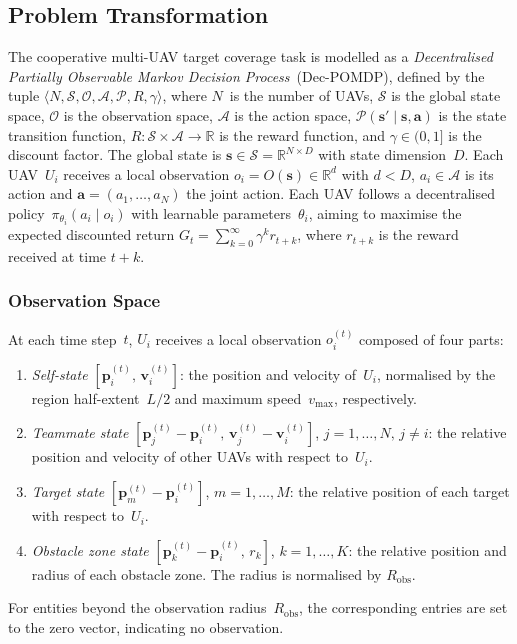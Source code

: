 \subsection{Problem Transformation}
\label{subsec:problem_transformation}

The cooperative multi-UAV target coverage task is modelled as a
\emph{Decentralised Partially Observable Markov Decision Process}~(Dec-POMDP),
defined by the tuple
$\langle N, \mathcal{S}, \mathcal{O}, \mathcal{A}, \mathcal{P}, R, \gamma
\rangle$,
where $N$~is the number of UAVs,
$\mathcal{S}$ is the global state space,
$\mathcal{O}$ is the observation space,
$\mathcal{A}$ is the action space,
$\mathcal{P}(\mathbf{s}' \mid \mathbf{s}, \mathbf{a})$ is the state transition
function,
$R: \mathcal{S} \times \mathcal{A} \to \mathbb{R}$ is the reward function, and
$\gamma \in (0,1]$ is the discount factor.
The global state is $\mathbf{s} \in \mathcal{S} = \mathbb{R}^{N \times D}$
with state dimension~$D$.
Each UAV~$U_i$ receives a local observation
$o_i = O(\mathbf{s}) \in \mathbb{R}^{d}$ with $d < D$,
$a_i \in \mathcal{A}$ is its action and
$\mathbf{a} = (a_1, \dots, a_N)$ the joint action.
Each UAV follows a decentralised policy~$\pi_{\theta_i}(a_i \mid o_i)$ with
learnable parameters~$\theta_i$, aiming to maximise the expected discounted
return $G_t = \sum_{k=0}^{\infty} \gamma^k r_{t+k}$, where $r_{t+k}$ is the
reward received at time $t+k$.

\subsubsection{Observation Space}
\label{subsubsec:observation}

At each time step~$t$, $U_i$ receives a local observation $o_i^{(t)}$ composed
of four parts:
\begin{enumerate}
  \item \emph{Self-state}
    $[\mathbf{p}_i^{(t)},\, \mathbf{v}_i^{(t)}]$:
    the position and velocity of~$U_i$, normalised by the region half-extent~$L/2$
    and maximum speed~$v_{\max}$, respectively.
  \item \emph{Teammate state}
    $[\mathbf{p}_j^{(t)} - \mathbf{p}_i^{(t)},\,
      \mathbf{v}_j^{(t)} - \mathbf{v}_i^{(t)}]$,
    $j = 1,\dots,N,\, j \ne i$:
    the relative position and velocity of other UAVs with respect to~$U_i$.
  \item \emph{Target state}
    $[\mathbf{p}_m^{(t)} - \mathbf{p}_i^{(t)}]$,
    $m = 1,\dots,M$:
    the relative position of each target with respect to~$U_i$.
  \item \emph{Obstacle zone state}
    $[\mathbf{p}_k^{(t)} - \mathbf{p}_i^{(t)},\, r_k]$,
    $k = 1,\dots,K$:
    the relative position and radius of each obstacle zone.
    The radius is normalised by $R_{\mathrm{obs}}$.
\end{enumerate}
For entities beyond the observation radius~$R_{\mathrm{obs}}$, the
corresponding entries are set to the zero vector, indicating no observation.

